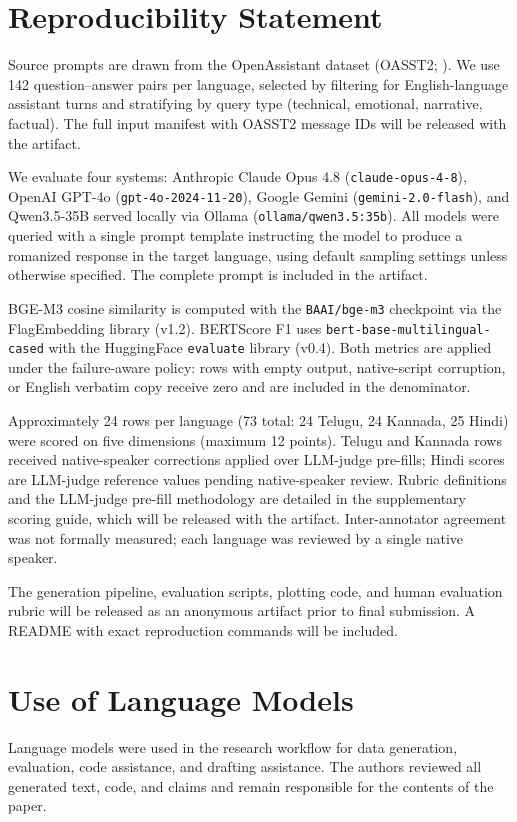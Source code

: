 \section*{Reproducibility Statement}

\enspace
Source prompts are drawn from the OpenAssistant dataset (OASST2; \citealt{kopf2023openassistant}). We use 142 question–answer pairs per language, selected by filtering for English-language assistant turns and stratifying by query type (technical, emotional, narrative, factual). The full input manifest with OASST2 message IDs will be released with the artifact.

\enspace
We evaluate four systems: Anthropic Claude Opus 4.8 (\texttt{claude-opus-4-8}), OpenAI GPT-4o (\texttt{gpt-4o-2024-11-20}), Google Gemini (\texttt{gemini-2.0-flash}), and Qwen3.5-35B served locally via Ollama (\texttt{ollama/qwen3.5:35b}). All models were queried with a single prompt template instructing the model to produce a romanized response in the target language, using default sampling settings unless otherwise specified. The complete prompt is included in the artifact.

\enspace
BGE-M3 cosine similarity is computed with the \texttt{BAAI/bge-m3} checkpoint via the FlagEmbedding library (v1.2). BERTScore F1 uses \texttt{bert-base-multilingual-cased} with the HuggingFace \texttt{evaluate} library (v0.4). Both metrics are applied under the failure-aware policy: rows with empty output, native-script corruption, or English verbatim copy receive zero and are included in the denominator.

\enspace
Approximately 24 rows per language (73 total: 24 Telugu, 24 Kannada, 25 Hindi) were scored on five dimensions (maximum 12 points). Telugu and Kannada rows received native-speaker corrections applied over LLM-judge pre-fills; Hindi scores are LLM-judge reference values pending native-speaker review. Rubric definitions and the LLM-judge pre-fill methodology are detailed in the supplementary scoring guide, which will be released with the artifact. Inter-annotator agreement was not formally measured; each language was reviewed by a single native speaker.

\enspace
The generation pipeline, evaluation scripts, plotting code, and human evaluation rubric will be released as an anonymous artifact prior to final submission. A README with exact reproduction commands will be included.

\section*{Use of Language Models}

Language models were used in the research workflow for data generation,
evaluation, code assistance, and drafting assistance. The authors reviewed all
generated text, code, and claims and remain responsible for the contents of the
paper.
